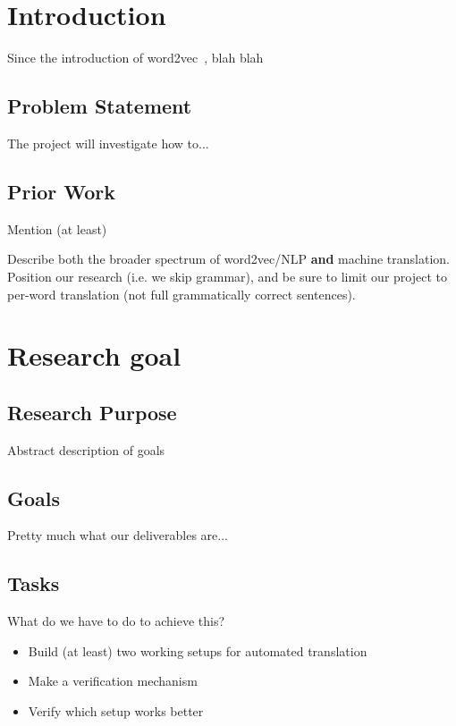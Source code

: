 \section{Introduction}
Since the introduction of word2vec~\cite{mikolov2013efficient, mikolov2013distributed}, blah blah

\subsection{Problem Statement}
The project will investigate how to...

\subsection{Prior Work}
Mention (at least)~\cite{levy2014linguistic, mikolov2013exploiting, wolf2014joint}

Describe both the broader spectrum of word2vec/NLP \textbf{and} machine translation. Position our research (i.e. we skip grammar), and be sure to limit our project to per-word translation (not full grammatically correct sentences).

\lipsum[66]

\section{Research goal}
\lipsum[66]

\subsection{Research Purpose}
Abstract description of goals

\lipsum[66]

\subsection{Goals}
Pretty much what our deliverables are...

\subsection{Tasks}
What do we have to do to achieve this?

\begin{itemize}
  \item Build (at least) two working setups for automated translation
  \item Make a verification mechanism
  \item Verify which setup works better
\end{itemize}

